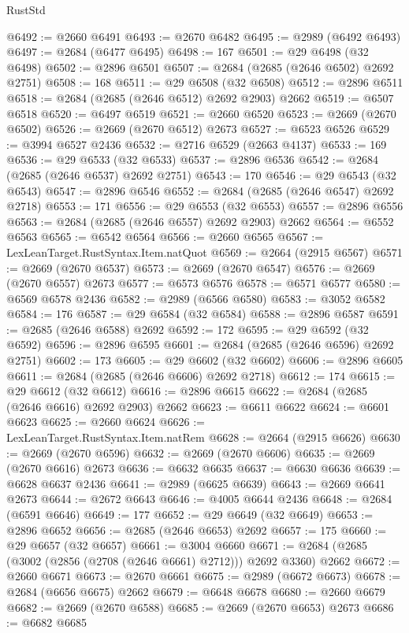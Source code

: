 \begin{lexlean}{RustStd}
\begin{coremodule}
@6492 := @2660 @6491
@6493 := @2670 @6482
@6495 := @2989 (@6492 @6493)
@6497 := @2684 (@6477 @6495)
@6498 := 167
@6501 := @29 @6498 (@32 @6498)
@6502 := @2896 @6501
@6507 := @2684 (@2685 (@2646 @6502) @2692 @2751)
@6508 := 168
@6511 := @29 @6508 (@32 @6508)
@6512 := @2896 @6511
@6518 := @2684 (@2685 (@2646 @6512) @2692 @2903) @2662
@6519 := @6507 @6518
@6520 := @6497 @6519
@6521 := @2660 @6520
@6523 := @2669 (@2670 @6502)
@6526 := @2669 (@2670 @6512) @2673
@6527 := @6523 @6526
@6529 := @3994 @6527 @2436
@6532 := @2716 @6529 (@2663 @4137)
@6533 := 169
@6536 := @29 @6533 (@32 @6533)
@6537 := @2896 @6536
@6542 := @2684 (@2685 (@2646 @6537) @2692 @2751)
@6543 := 170
@6546 := @29 @6543 (@32 @6543)
@6547 := @2896 @6546
@6552 := @2684 (@2685 (@2646 @6547) @2692 @2718)
@6553 := 171
@6556 := @29 @6553 (@32 @6553)
@6557 := @2896 @6556
@6563 := @2684 (@2685 (@2646 @6557) @2692 @2903) @2662
@6564 := @6552 @6563
@6565 := @6542 @6564
@6566 := @2660 @6565
@6567 := LexLeanTarget.RustSyntax.Item.natQuot
@6569 := @2664 (@2915 @6567)
@6571 := @2669 (@2670 @6537)
@6573 := @2669 (@2670 @6547)
@6576 := @2669 (@2670 @6557) @2673
@6577 := @6573 @6576
@6578 := @6571 @6577
@6580 := @6569 @6578 @2436
@6582 := @2989 (@6566 @6580)
@6583 := @3052 @6582
@6584 := 176
@6587 := @29 @6584 (@32 @6584)
@6588 := @2896 @6587
@6591 := @2685 (@2646 @6588) @2692
@6592 := 172
@6595 := @29 @6592 (@32 @6592)
@6596 := @2896 @6595
@6601 := @2684 (@2685 (@2646 @6596) @2692 @2751)
@6602 := 173
@6605 := @29 @6602 (@32 @6602)
@6606 := @2896 @6605
@6611 := @2684 (@2685 (@2646 @6606) @2692 @2718)
@6612 := 174
@6615 := @29 @6612 (@32 @6612)
@6616 := @2896 @6615
@6622 := @2684 (@2685 (@2646 @6616) @2692 @2903) @2662
@6623 := @6611 @6622
@6624 := @6601 @6623
@6625 := @2660 @6624
@6626 := LexLeanTarget.RustSyntax.Item.natRem
@6628 := @2664 (@2915 @6626)
@6630 := @2669 (@2670 @6596)
@6632 := @2669 (@2670 @6606)
@6635 := @2669 (@2670 @6616) @2673
@6636 := @6632 @6635
@6637 := @6630 @6636
@6639 := @6628 @6637 @2436
@6641 := @2989 (@6625 @6639)
@6643 := @2669 @6641 @2673
@6644 := @2672 @6643
@6646 := @4005 @6644 @2436
@6648 := @2684 (@6591 @6646)
@6649 := 177
@6652 := @29 @6649 (@32 @6649)
@6653 := @2896 @6652
@6656 := @2685 (@2646 @6653) @2692
@6657 := 175
@6660 := @29 @6657 (@32 @6657)
@6661 := @3004 @6660
@6671 := @2684 (@2685 (@3002 (@2856 (@2708 (@2646 @6661) @2712))) @2692 @3360) @2662
@6672 := @2660 @6671
@6673 := @2670 @6661
@6675 := @2989 (@6672 @6673)
@6678 := @2684 (@6656 @6675) @2662
@6679 := @6648 @6678
@6680 := @2660 @6679
@6682 := @2669 (@2670 @6588)
@6685 := @2669 (@2670 @6653) @2673
@6686 := @6682 @6685

\end{coremodule}
\end{lexlean}

